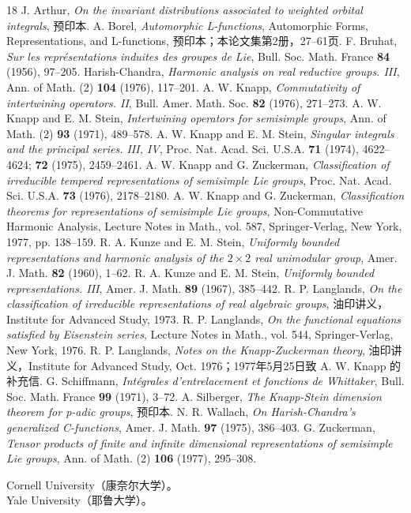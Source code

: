 \begin{thebibliography}{18}
 J. Arthur, \textit{On the invariant distributions associated to weighted orbital integrals}, 预印本.
 A. Borel, \textit{Automorphic L-functions}, Automorphic Forms, Representations, and L-functions, 预印本；本论文集第2册，27--61页.
 F. Bruhat, \textit{Sur les représentations induites des groupes de Lie}, Bull. Soc. Math. France \textbf{84} (1956), 97--205.
 Harish-Chandra, \textit{Harmonic analysis on real reductive groups. III}, Ann. of Math. (2) \textbf{104} (1976), 117--201.
 A. W. Knapp, \textit{Commutativity of intertwining operators. II}, Bull. Amer. Math. Soc. \textbf{82} (1976), 271--273.
 A. W. Knapp and E. M. Stein, \textit{Intertwining operators for semisimple groups}, Ann. of Math. (2) \textbf{93} (1971), 489--578.
 A. W. Knapp and E. M. Stein, \textit{Singular integrals and the principal series. III, IV}, Proc. Nat. Acad. Sci. U.S.A. \textbf{71} (1974), 4622--4624; \textbf{72} (1975), 2459--2461.
 A. W. Knapp and G. Zuckerman, \textit{Classification of irreducible tempered representations of semisimple Lie groups}, Proc. Nat. Acad. Sci. U.S.A. \textbf{73} (1976), 2178--2180.
 A. W. Knapp and G. Zuckerman, \textit{Classification theorems for representations of semisimple Lie groups}, Non-Commutative Harmonic Analysis, Lecture Notes in Math., vol. 587, Springer-Verlag, New York, 1977, pp. 138--159.
 R. A. Kunze and E. M. Stein, \textit{Uniformly bounded representations and harmonic analysis of the $2\times2$ real unimodular group}, Amer. J. Math. \textbf{82} (1960), 1--62.
 R. A. Kunze and E. M. Stein, \textit{Uniformly bounded representations. III}, Amer. J. Math. \textbf{89} (1967), 385--442.
 R. P. Langlands, \textit{On the classification of irreducible representations of real algebraic groups}, 油印讲义，Institute for Advanced Study, 1973.
 R. P. Langlands, \textit{On the functional equations satisfied by Eisenstein series}, Lecture Notes in Math., vol. 544, Springer-Verlag, New York, 1976.
 R. P. Langlands, \textit{Notes on the Knapp-Zuckerman theory}, 油印讲义，Institute for Advanced Study, Oct. 1976；1977年5月25日致 A. W. Knapp 的补充信.
 G. Schiffmann, \textit{Intégrales d'entrelacement et fonctions de Whittaker}, Bull. Soc. Math. France \textbf{99} (1971), 3--72.
 A. Silberger, \textit{The Knapp-Stein dimension theorem for p-adic groups}, 预印本.
 N. R. Wallach, \textit{On Harish-Chandra's generalized C-functions}, Amer. J. Math. \textbf{97} (1975), 386--403.
 G. Zuckerman, \textit{Tensor products of finite and infinite dimensional representations of semisimple Lie groups}, Ann. of Math. (2) \textbf{106} (1977), 295--308.
\end{thebibliography}
\noindent Cornell University（康奈尔大学）。\\
Yale University（耶鲁大学）。
